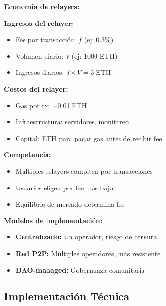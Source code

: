 \documentclass[11pt,a4paper,twoside]{book}
\begin{document}
\begin{mathnote}
\textbf{Econom\'ia de relayers:}

\textbf{Ingresos del relayer:}
\begin{itemize}
    \item Fee por transacci\'on: $f$ (ej: 0.3\%)
    \item Volumen diario: $V$ (ej: 1000 ETH)
    \item Ingresos diarios: $f \times V = 3$ ETH
\end{itemize}

\textbf{Costos del relayer:}
\begin{itemize}
    \item Gas por tx: $\sim$0.01 ETH
    \item Infraestructura: servidores, monitoreo
    \item Capital: ETH para pagar gas antes de recibir fee
\end{itemize}

\textbf{Competencia:}
\begin{itemize}
    \item M\'ultiples relayers compiten por transacciones
    \item Usuarios eligen por fee m\'as bajo
    \item Equilibrio de mercado determina fee
\end{itemize}

\textbf{Modelos de implementaci\'on:}
\begin{itemize}
    \item \textbf{Centralizado:} Un operador, riesgo de censura
    \item \textbf{Red P2P:} M\'ultiples operadores, m\'as resistente
    \item \textbf{DAO-managed:} Gobernanza comunitaria
\end{itemize}
\end{mathnote}

\subsection{Implementaci\'on T\'ecnica}
\end{document}
